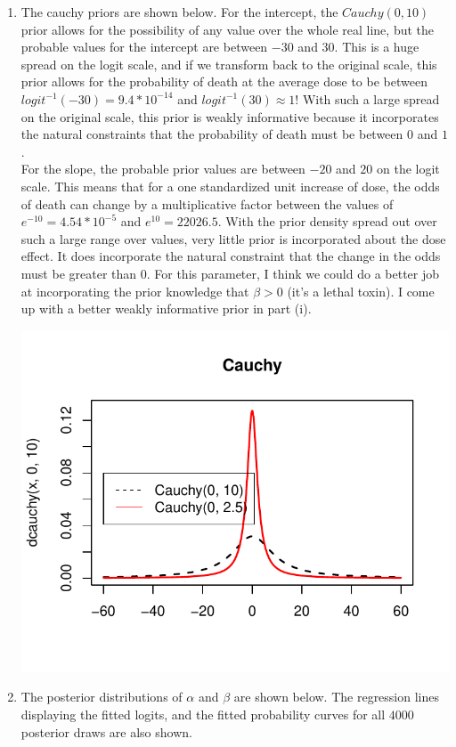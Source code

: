 \documentclass[12pt]{article}\usepackage[]{graphicx}\usepackage[]{color}
\newenvironment{knitrout}{}{} %
\begin{document}
\begin{enumerate}
\begin{enumerate}
\begin{knitrout}
\end{knitrout}

\item The cauchy priors are shown below. For the intercept, the $Cauchy(0, 10)$ prior allows for the possibility of any value over the whole real line, but the probable values for the intercept are between $-30$ and $30$. This is a huge spread on the logit scale, and if we transform back to the original scale, this prior allows for the probability of death at the average dose to be between $logit^{-1}(-30) = 9.4*10^{-14}$ and $logit^{-1}(30) \approx 1$! With such a large spread on the original scale, this prior is weakly informative because it incorporates the natural constraints that the probability of death must be between $0$ and $1$. \\

For the slope, the probable prior values are between $-20$ and $20$ on the logit scale. This means that for a one standardized unit increase of dose, the odds of death can change by a multiplicative factor between the values of $e^{-10} = 4.54*10^{-5}$ and $e^{10} = 22026.5$. With the prior density spread out over such a large range over values, very little prior is incorporated about the dose effect. It does incorporate the natural constraint that the change in the odds must be greater than $0$. For this parameter, I think we could do a better job at incorporating the prior knowledge that $\beta > 0$ (it's a lethal toxin). I come up with a better weakly informative prior in part (i).  

\begin{knitrout}\footnotesize
{}\color{fgcolor}
\includegraphics[width=.5\linewidth]{figure/dcauchy-1} 

\end{knitrout}

\item The posterior distributions of $\alpha$ and $\beta$ are shown below. The regression lines displaying the fitted logits, and the fitted probability curves for all $4000$ posterior draws are also shown. \\


\end{enumerate}
\end{enumerate}
\end{document}
